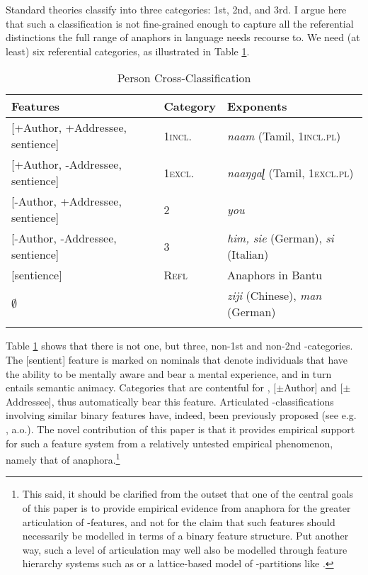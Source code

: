 \documentclass[output=paper, modfonts, nonflat]{langsci/langscibook}
\begin{document}
\noindent Standard theories classify \person{} into three categories: 1st, 2nd,
and 3rd. I argue here that such a classification is not fine-grained
enough to capture all the referential distinctions the full range of
anaphors in language needs recourse to. We need (at least) six
referential categories, as illustrated in Table \ref{per1}.
\begin{table}[h]
	\caption{Person Cross-Classification}
	\label{per1}
	\begin{tabularx}{\textwidth}{lll}
		\lsptoprule
		\textbf{Features} & \textbf{Category} & \textbf{Exponents}\\  
		\midrule
		{[+Author, +Addressee, sentience]} & \textsc{1incl.} & \textit{naam}
		(Tamil, \textsc{1incl.pl})\\
		{[+Author, -Addressee, sentience]} &  \textsc{1excl.} &
		\textit{naaŋgaɭ}
		(Tamil, \textsc{1excl.pl})\\
		{[-Author, +Addressee, sentience]} & \textsc{2} & \textit{you}\\
		{[-Author, -Addressee, sentience]} & \textsc{3} & \textit{him,
			sie} (German), \textit{si} (Italian)\\
		\midrule
		{[sentience]} & \textsc{Refl} & Anaphors in Bantu\\
		$\emptyset$ & \nul{} & \textit{ziji} (Chinese),
		\textit{man} (German)\\
		\lspbottomrule
	\end{tabularx}
\end{table}
\newline\noindent   Table \ref{per1} shows that there is not one, but three, non-1st and
  non-2nd \person-categories. The [sentient] feature is marked on
  nominals that denote individuals that have the ability to be
  mentally aware and bear a mental experience, and in turn entails
  semantic animacy. Categories that are contentful for \person,
  [$\pm$Author] and [$\pm$Addressee], thus automatically bear this
  feature.  Articulated \person-classifications involving similar
  binary features have, indeed, been previously proposed (see
  e.g. \citealt{nevins:2007, anag:2005}, a.o.). The novel contribution of this
  paper is that it provides empirical support for such a feature
  system from a relatively untested empirical phenomenon, namely that
  of anaphora.\footnote{This said, it should be clarified from the
    outset that one of the central goals of this paper is to provide
    empirical evidence from anaphora for the greater articulation of
    \person-features, and not for the claim that such features should
    necessarily be modelled in terms of a binary feature
    structure. Put another way, such a level of articulation may well
    also be modelled through feature hierarchy systems such as
    \citet{harleyritter:2002} or a lattice-based model of
    \person-partitions like \citet{harbour:2016}.}
\end{document}
